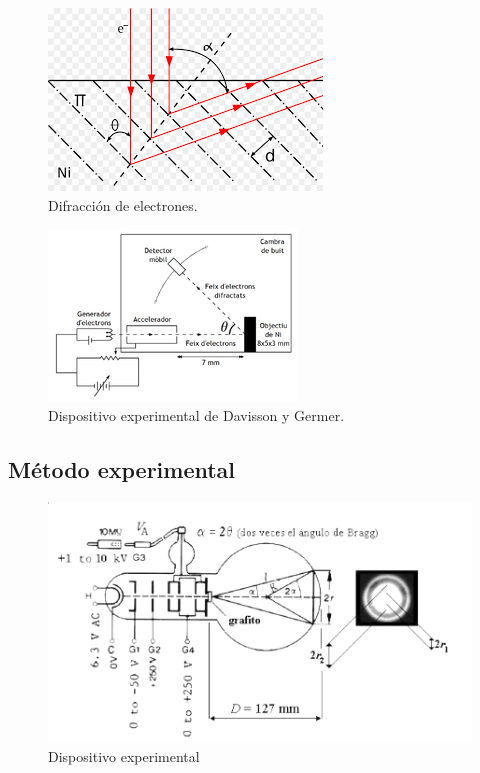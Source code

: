 \documentclass[]{article}
\begin{document}
\begin{figure}[H]
\centering
\includegraphics{difraccion.png}
\caption{Difracción de electrones.}
\end{figure}

\begin{figure}[H]
\centering
\includegraphics{experimento.png}
\caption{Dispositivo experimental de Davisson y Germer.}
\end{figure}

\newpage

\hypertarget{muxe9todo-experimental}{%
\subsection{Método experimental}\label{muxe9todo-experimental}}

\begin{figure}[H]
\centering
\includegraphics{geometria_experimento.png}
\caption{Dispositivo experimental}
\end{figure}
\end{document}
